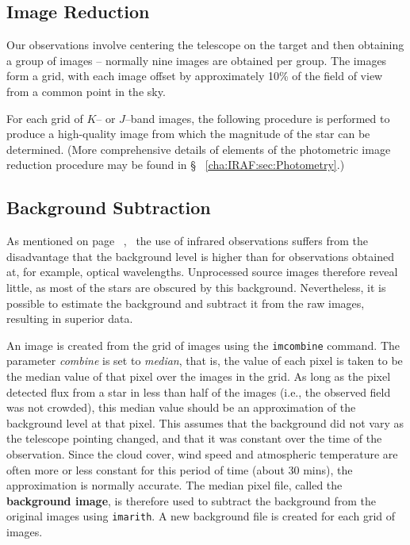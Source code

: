 
\subsection{Image Reduction}
\label{cha:InfraredDataReductionTechniques:sec:Photometry:subsec:ImageReduction}

Our observations involve centering the telescope on the target and
then obtaining a group of images -- normally nine images are obtained
per group. The images form a grid, with each image offset by
approximately 10\% of the field of view from a common point in the
sky. %

\vspace{\myparskip}

For each grid of $K$-- or $J$--band images, the following procedure is
performed to produce a high-quality image from which the magnitude of
the star can be determined. (More comprehensive details of elements of the photometric image
reduction procedure may be found in \S~%
\vref{cha:IRAF:sec:Photometry}.) %


\subsection{Background Subtraction}
\label{cha:InfraredDataReductionTechniques:sec:Photometry:subsec:BackgroundSubtraction}

As mentioned on page~%
\pageref{cha:InfraredDataReductionTechniques:sec:InfraredAstronomy:subsubsec:Disadvantages},%
\ the use of infrared observations suffers from the disadvantage that
the background level is higher than for observations obtained at, for
example, optical wavelengths. Unprocessed source images therefore
reveal little, as most of the stars are obscured by this
background. Nevertheless, it is possible to estimate the background
and subtract it from the raw images, resulting in superior data. %

\vspace{\myparskip}

An image is created from the grid of images using the
\texttt{imcombine} command. The parameter \textit{combine} is set to
\textit{median}, that is, the value of each pixel is taken to be the
median value of that pixel over the images in the grid. As long as the
pixel detected flux from a star in less than half of the images (i.e.,
the observed field was not crowded), this median value should be an
approximation of the background level at that pixel. This assumes that
the background did not vary as the telescope pointing changed,
and that it was constant over the time of the observation. Since the
cloud cover, wind speed and atmospheric temperature are often more or less constant
for this period of time (about 30 mins), the approximation
is normally accurate. The median pixel file, called the
\textbf{background image}, is therefore used to subtract the background from the original images
using \texttt{imarith}. A new background file is created for each
grid of images. %

